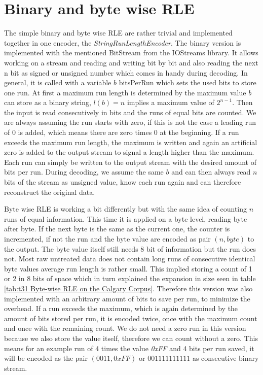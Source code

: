 \section{Binary and byte wise RLE}
\par{
	The simple binary and byte wise RLE are rather trivial and implemented together in one encoder, the \textit{StringRunLengthEncoder}. The binary version is implemented with the mentioned BitStream from the IOStreams library. It allows working on a stream and reading and writing bit by bit and also reading the next n bit as signed or unsigned number which comes in handy during decoding. In general, it is called with a variable $b$ bitsPerRun which sets the used bits to store one run. At first a maximum run length is determined by the maximum value $b$ can store as a binary string, $l(b) = n$ implies a maximum value of $2^{n-1}$. Then the input is read consecutively in bits and the runs of equal bits are counted. We are always assuming the run starts with zero, if this is not the case a leading run of 0 is added, which means there are zero times 0 at the beginning. If a run exceeds the maximum run length, the maximum is written and again an artificial zero is added to the output stream to signal a length higher than the maximum. Each run can simply be written to the output stream with the desired amount of bits per run. During decoding, we assume the same $b$ and can then always read $n$ bits of the stream as unsigned value, know each run again and can therefore reconstruct the original data.
}
\par{
	Byte wise RLE is working a bit differently but with the same idea of counting $n$ runs of equal information. This time it is applied on a byte level, reading byte after byte. If the next byte is the same as the current one, the counter is incremented, if not the run and the byte value are encoded as pair $(n, byte)$ to the output. The byte value itself still needs 8 bit of information but the run does not. Most raw untreated data does not contain long runs of consecutive identical byte values average run length is rather small. This implied storing a count of 1 or 2 in 8 bits of space which in turn explained the expansion in size seen in table \ref{tab:t31 Byte-wise RLE on the Calgary Corpus}. Therefore this version was also implemented with an arbitrary amount of bits to save per run, to minimize the overhead. If a run exceeds the maximum, which is again determined by the amount of bits stored per run, it is encoded twice, once with the maximum count and once with the remaining count. We do not need a zero run in this version because we also store the value itself, therefore we can count without a zero. This means for an example run of 4 times the value \textit{0xFF} and 4 bits per run saved, it will be encoded as the pair $(0011,0xFF)$ or $001111111111$ as consecutive binary stream.
}
